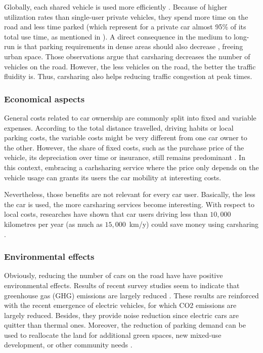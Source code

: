 \begin{bibunit}[ieeetr]
\medskip
Globally, each shared vehicle is used more efficiently \cite{litman_evaluating_2000, schuster_assessing_2005}.
Because of higher utilization rates than single-user private vehicles, they spend more time on the road and less time parked (which represent for a private car almost 95\% of its total use time, as mentioned in \cite{transflash_2013}).
A direct consequence in the medium to long-run is that parking requirements in dense areas should also decrease \cite{mitchell_reinventing_2010}, freeing urban space.
Those observations argue that carsharing decreases the number of vehicles on the road.
However, the less vehicles on the road, the better the traffic fluidity is.
Thus, carsharing also helps reducing traffic congestion at peak times.


\subsubsection{Economical aspects}
General costs related to car ownership are commonly split into fixed and variable expenses.
According to the total distance travelled, driving habits or local parking costs, the variable costs might be very different from one car owner to the other.
However, the share of fixed costs, such as the purchase price of the vehicle, its depreciation over time or insurance, still remains predominant \cite{cout_reel_auto}.
In this context, embracing a carhsharing service where the price only depends on the vehicle usage can grants its users the car mobility at interesting costs.

\medskip
Nevertheless, those benefits are not relevant for every car user.
Basically, the less the car is used, the more carsharing services become interesting.
With respect to local costs, researches have shown that car users driving less than $10,000$ kilometres per year (as much as \hbox{$15,000$ km/y}) could save money using carsharing \cite{litman_evaluating_2000, prettenthaler_ownership_1999}.



\subsubsection{Environmental effects}

Obviously, reducing the number of cars on the road have have positive environmental effects.
Results of recent survey studies seem to indicate that greenhouse gas (GHG) emissions are largely reduced 
\cite{martin_greenhouse_2011, firnkorn_what_2011}.
These results are reinforced with the recent emergence of electric vehicles, for which CO2 emissions are largely reduced.
Besides, they provide noise reduction since electric cars are quitter than thermal ones.
Moreover, the reduction of parking demand can be used to reallocate the land for additional green spaces, new mixed-use development, or other community needs \cite{cohen_carsharing_2008}.


\end{bibunit}
